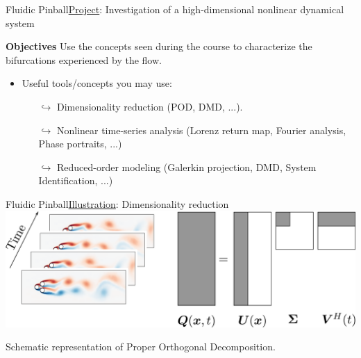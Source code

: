 \documentclass[usenames,dvipsnames,svgnames,10pt,aspectratio=169]{beamer}
\begin{document}
\begin{frame}[t, c]{Fluidic Pinball}{\underline{Project}: Investigation of a high-dimensional nonlinear dynamical system}
	\begin{block}{\centering \textbf{Objectives}}
		\centering
		Use the concepts seen during the course to characterize the bifurcations experienced by the flow.
	\end{block}

	\bigskip

	\begin{itemize}
		\item Useful tools/concepts you may use:
		\begin{itemize}
			\item[$\hookrightarrow$] Dimensionality reduction (POD, DMD, ...).
			\item[$\hookrightarrow$] Nonlinear time-series analysis (Lorenz return map, Fourier analysis, Phase portraits, ...)
			\item[$\hookrightarrow$] Reduced-order modeling (Galerkin projection, DMD, System Identification, ...)
		\end{itemize}
	\end{itemize}

	\vspace{1.5cm}
\end{frame}

\begin{frame}[t, c]{Fluidic Pinball}{\underline{Illustration}: Dimensionality reduction}
	\centering
	\includegraphics[width=.8\textwidth]{dimensionality_reduction_pinball}

	\bigskip

	Schematic representation of Proper Orthogonal Decomposition.
	\vspace{1cm}
\end{frame}
\end{document}
